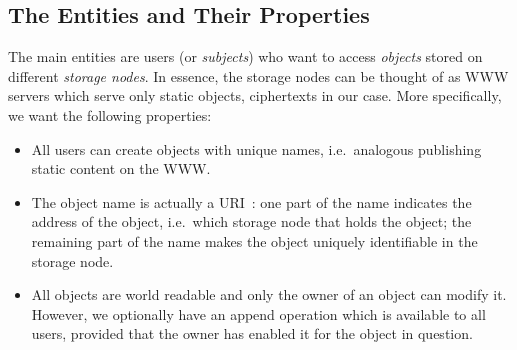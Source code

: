 \subsection{The Entities and Their Properties}\label{sec:EntitiesProperties}


The main entities are users (or \emph{subjects}) who want to access 
\emph{objects} stored on different \emph{storage nodes}.
In essence, the storage nodes can be thought of as \ac{WWW} servers which serve 
only static objects, ciphertexts in our case.
More specifically, we want the following properties:
\begin{itemize}
    \item All users can create objects with unique names, i.e.\ analogous publishing static content on the \ac{WWW}.
    \item The object name is actually a \ac{URI}~\cite{rfc3986}:
one part of the name indicates the address of the object, i.e.\ which storage 
node that holds the object;
the remaining part of the name makes the object uniquely identifiable in the 
storage node.
    \item All objects are world readable and only the owner of an object can modify it.
However, we optionally have an append operation which is available to all 
users, provided that the owner has enabled it for the object in question.
\end{itemize}

